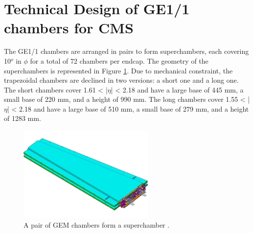   \section{Technical Design of GE1/1 chambers for CMS}

    The GE1/1 chambers are arranged in pairs to form superchambers, each covering 10$^o$ in $ \phi $ for a total of 72 chambers per endcap. The geometry of the superchambers is represented in Figure \ref{fig:II-1-superchamber}. Due to mechanical constraint, the trapezoidal chambers are declined in two versions: a short one and a long one. The short chambers cover 1.61 < |$\eta$| < 2.18 and have a large base of 445 mm, a small base of 220 mm, and a height of 990 mm. The long chambers cover 1.55 < |$\eta$| < 2.18 and have a large base of 510 mm, a small base of 279 mm, and a height of 1283 mm. \\

    \begin{figure}[h!]
      \centering
      \includegraphics[width=0.6\textwidth]{img/II-1-gem/superchamber.pdf}
      \caption{A pair of GEM chambers form a superchamber \cite{Colaleo:2021453}.}
      \label{fig:II-1-superchamber}
    \end{figure}


